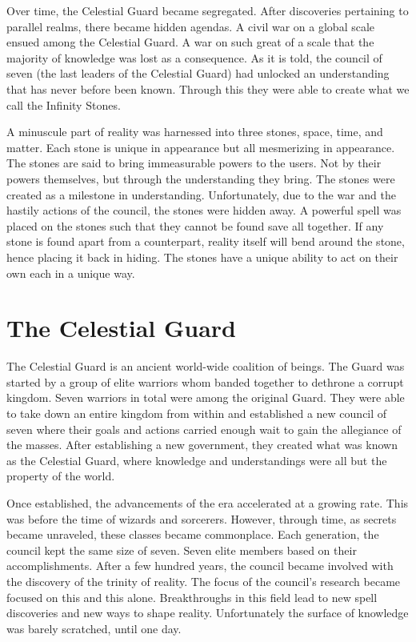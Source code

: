 \documentclass[letterpaper,10pt,twoside,twocolumn,openany]{book}
\begin{document}
Over time, the Celestial Guard became segregated. After discoveries pertaining to parallel realms, there became hidden agendas. A civil war on a global scale ensued among the Celestial Guard. A war on such great of a scale that the majority of knowledge was lost as a consequence. As it is told, the council of seven (the last leaders of the Celestial Guard) had unlocked an understanding that has never before been known. Through this they were able to create what we call the Infinity Stones. 

A minuscule part of reality was harnessed into three stones, space, time, and matter. Each stone is unique in appearance but all mesmerizing in appearance. The stones are said to bring immeasurable powers to the users. Not by their powers themselves, but through the understanding they bring. The stones were created as a milestone in understanding. Unfortunately, due to the war and the hastily actions of the council, the stones were hidden away. A powerful spell was placed on the stones such that they cannot be found save all together. If any stone is found apart from a counterpart, reality itself will bend around the stone, hence placing it back in hiding. The stones have a unique ability to act on their own each in a unique way. 

\section{The Celestial Guard}

The Celestial Guard is an ancient world-wide coalition of beings. The Guard was started by a group of elite warriors whom banded together to dethrone a corrupt kingdom. Seven warriors in total were among the original Guard. They were able to take down an entire kingdom from within and established a new council of seven where their goals and actions carried enough wait to gain the allegiance of the masses. After establishing a new government, they created what was known as the Celestial Guard, where knowledge and understandings were all but the property of the world. 

Once established, the advancements of the era accelerated at a growing rate. This was before the time of wizards and sorcerers. However, through time, as secrets became unraveled, these classes became commonplace. Each generation, the council kept the same size of seven. Seven elite members based on their accomplishments. After a few hundred years, the council became involved with the discovery of the trinity of reality. The focus of the council's research became focused on this and this alone. Breakthroughs in this field lead to new spell discoveries and new ways to shape reality. Unfortunately the surface of knowledge was barely scratched, until one day.
\end{document}

